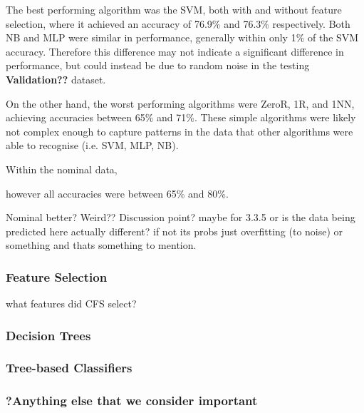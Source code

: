 The best performing algorithm was the SVM, both with and without feature selection, where it achieved an accuracy of 76.9\% and 76.3\% respectively. Both NB and MLP were similar in performance, generally within only 1\% of the SVM accuracy. Therefore this difference may not indicate a significant difference in performance, but could instead be due to random noise in the testing \textbf{Validation??} dataset.

On the other hand, the worst performing algorithms were ZeroR, 1R, and 1NN, achieving accuracies between 65\% and 71\%. These simple algorithms were likely not complex enough to capture patterns in the data that other algorithms were able to recognise (i.e. SVM, MLP, NB).


Within the nominal data, 


however all accuracies were between 65\% and 80\%. 

Nominal better? Weird?? Discussion point? maybe for 3.3.5
or is the data being predicted here actually different? if not its probs just overfitting (to noise) or something and thats something to mention.

\subsubsection{Feature Selection}


what features did CFS select?

\subsubsection{Decision Trees}



\subsubsection{Tree-based Classifiers}




\subsubsection{?Anything else that we consider important}

